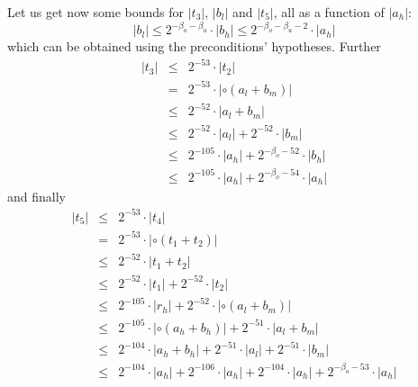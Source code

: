 \documentclass[a4paper,10pt,twoside]{article}
\newenvironment{proof}[1][Proof]{\begin{trivlist}
\item[\hskip \labelsep {\bfseries #1}]}{\end{trivlist}}
\newcommand{\hi}{\ensuremath{\mathit{h}}}
\newcommand{\mi}{\ensuremath{\mathit{m}}}
\newcommand{\lo}{\ensuremath{\mathit{l}}}
\begin{document}
\begin{proof}
Let us get now some bounds for $\left \vert t_3 \right \vert$, $\left \vert b_\lo \right \vert$ and
$\left \vert t_5 \right \vert$, all as a function of
$\left \vert a_\hi \right \vert$:
$$\left \vert b_\lo \right \vert \leq 2^{-\beta_o-\beta_u} \cdot \left \vert b_\hi \right \vert \leq
2^{-\beta_o-\beta_u-2} \cdot \left \vert a_\hi \right \vert$$
which can be obtained using the preconditions' hypotheses. Further
\begin{eqnarray*}
\left \vert t_3 \right \vert & \leq & 2^{-53} \cdot \left \vert t_2 \right \vert \\
& = & 2^{-53} \cdot \left \vert \circ \left( a_\lo + b_\mi \right) \right \vert \\
& \leq & 2^{-52} \cdot \left \vert a_\lo + b_\mi \right \vert \\
& \leq & 2^{-52} \cdot \left \vert a_\lo \right \vert + 2^{-52} \cdot \left \vert b_\mi \right \vert \\
& \leq & 2^{-105} \cdot \left \vert a_\hi \right \vert + 2^{-\beta_o-52} \cdot \left \vert b_\hi \right \vert \\
& \leq & 2^{-105} \cdot \left \vert a_\hi \right \vert + 2^{-\beta_o-54} \cdot \left \vert a_\hi \right \vert
\end{eqnarray*}
and finally
\begin{eqnarray*}
\left \vert t_5 \right \vert & \leq & 2^{-53} \cdot \left \vert t_4 \right \vert \\
& = & 2^{-53} \cdot \left \vert \circ \left( t_1 + t_2 \right) \right \vert \\
& \leq & 2^{-52} \cdot \left \vert t_1 + t_2 \right \vert \\
& \leq & 2^{-52} \cdot \left \vert t_1 \right \vert + 2^{-52} \cdot \left \vert t_2 \right \vert \\
& \leq & 2^{-105} \cdot \left \vert r_\hi \right \vert + 2^{-52} \cdot \left \vert \circ \left( a_\lo + b_\mi \right) \right \vert \\
& \leq & 2^{-105} \cdot \left \vert \circ \left( a_\hi + b_\hi \right) \right \vert + 2^{-51} \cdot \left \vert a_\lo + b_\mi \right \vert \\
& \leq & 2^{-104} \cdot \left \vert a_\hi + b_\hi \right \vert + 2^{-51} \cdot \left \vert a_\lo \right \vert +
2^{-51} \cdot \left \vert b_\mi \right \vert \\
& \leq & 2^{-104} \cdot \left \vert a_\hi \right \vert + 2^{-106} \cdot \left \vert a_\hi \right \vert +
2^{-104} \cdot \left \vert a_\hi \right \vert + 2^{-\beta_o-53} \cdot \left \vert a_\hi \right \vert \\

\end{eqnarray*}
\end{proof}
\end{document}
